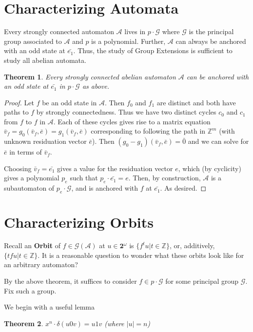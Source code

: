 \documentclass[12pt]{article}
\newcommand{\A}{\mathcal{A}}
\newcommand{\G}{\mathcal{G}}
\newcommand{\Z}{\mathbb{Z}}
\newcommand{\2}{\textbf{2}}
\renewcommand{\v}{\bar{v}}
\newtheorem{thm}{Theorem}
\begin{document}
\section{Characterizing Automata}
Every strongly connected automaton $\A$ lives in $p \cdot \G$ where 
$\G$ is the principal group associated to $\A$ and $p$ is a polynomial. 
Further, $\A$ can always be anchored with an odd state at $\bar{e_1}$. 
Thus, the study of Group Extensions is sufficient to study all abelian automata.

\begin{thm}
  Every strongly connected abelian automaton $\A$ can be anchored with an 
  odd state at $\bar{e_1}$ in $p \cdot \G$ as above.
\end{thm}

\begin{proof}
  Let $f$ be an odd state in $\A$. Then $f_0$ and $f_1$ are distinct
  and both have paths to $f$ by strongly connectedness. Thus we have two
  distinct cycles $c_0$ and $c_1$ from $f$ to $f$ in $\A$.
  Each of these cycles gives rise to a matrix equation 
  $\v_f = g_0(\v_f,\bar{e}) = g_1(\v_f,\bar{e})$ corresponding to following
  the path in $\Z^m$ (with unknown residuation vector $\bar{e}$). 
  Then $(g_0 - g_1)(\v_f, \bar{e}) = \bar{0}$ and we can solve for 
  $\bar{e}$ in terms of $\v_f$.

  Choosing $\v_f = \bar{e_1}$ gives a value for the residuation vector $e$,
  which (by cyclicity) gives a polynomial $p_e$ 
  such that $p_e \cdot \bar{e_1} = e$. Then, by construction, $\A$ is 
  a subautomaton of $p_e \cdot \G$, and is anchored with $f$ at $\bar{e_1}$.
  As desired.
\end{proof}

\section{Characterizing Orbits}

Recall an \textbf{Orbit} of $f \in \G(\A)$ at $u \in \2^{\omega}$
is $\{ f^t u | t \in \Z \}$, or, additively, $\{ tf u | t \in \Z \}$.
It is a reasonable question to wonder what these orbits look like
for an arbitrary automaton?

By the above theorem, it suffices to consider $f \in p \cdot \G$
for some principal group $\G$. Fix such a group.

We begin with a useful lemma

\begin{thm}
  $x^n \cdot \delta (u0v) = u1v$ (where $|u| = n$)
\end{thm}
\end{document}
